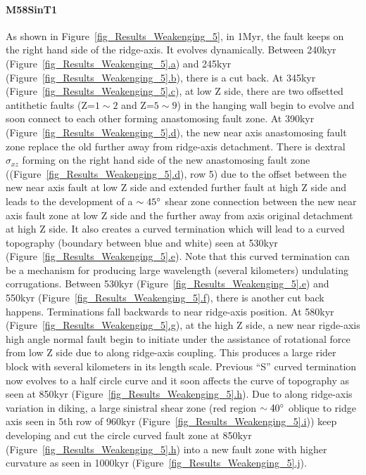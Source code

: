\paragraph{M58SinT1}\label{para_M58SinT1}

As shown in Figure~\hyperref[fig_Results_Weakenging_5]{\ref{fig_Results_Weakenging_5}}, in 1Myr, the fault keeps on the right hand side of the ridge-axis. It evolves dynamically. Between 240kyr (Figure~\hyperref[fig_Results_Weakenging_5]{\ref{fig_Results_Weakenging_5}.a}) and 245kyr (Figure~\hyperref[fig_Results_Weakenging_5]{\ref{fig_Results_Weakenging_5}.b}), there is a cut back. At 345kyr (Figure~\hyperref[fig_Results_Weakenging_5]{\ref{fig_Results_Weakenging_5}.c}), at low Z side, there are two offsetted antithetic faults (Z=$1\sim2$ and Z=$5\sim9$) in the hanging wall begin to evolve and soon connect to each other forming anastomosing fault zone. At 390kyr (Figure~\hyperref[fig_Results_Weakenging_5]{\ref{fig_Results_Weakenging_5}.d}), the new near axis anastomosing fault zone replace the old further away from ridge-axis detachment. There is dextral $\sigma_{xz}$ forming on the right hand side of the new anastomosing fault zone ((Figure~\hyperref[fig_Results_Weakenging_5]{\ref{fig_Results_Weakenging_5}.d}), row 5) due to the offset between the new near axis fault at low Z side and extended further fault at high Z side and leads to the development of a $\sim45\degree$ shear zone connection between the new near axis fault zone at low Z side and the further away from axis original detachment at high Z side. It also creates a curved termination which will lead to a curved topography (boundary between blue and white) seen at 530kyr (Figure~\hyperref[fig_Results_Weakenging_5]{\ref{fig_Results_Weakenging_5}.e}). Note that this curved termination can be a mechanism for producing large wavelength (several kilometers) undulating corrugations. Between 530kyr (Figure~\hyperref[fig_Results_Weakenging_5]{\ref{fig_Results_Weakenging_5}.e}) and 550kyr (Figure~\hyperref[fig_Results_Weakenging_5]{\ref{fig_Results_Weakenging_5}.f}), there is another cut back happens. Terminations fall backwards to near ridge-axis position. At 580kyr (Figure~\hyperref[fig_Results_Weakenging_5]{\ref{fig_Results_Weakenging_5}.g}), at the high Z side, a new near rigde-axis high angle normal fault begin to initiate under the assistance of rotational force from low Z side due to along ridge-axis coupling. This produces a large rider block with several kilometers in its length scale. Previous ``S'' curved termination now evolves to a half circle curve and it soon affects the curve of topography as seen at 850kyr (Figure~\hyperref[fig_Results_Weakenging_5]{\ref{fig_Results_Weakenging_5}.h}). Due to along ridge-axis variation in diking, a large sinistral shear zone (red region $\sim40\degree$ oblique to ridge axis seen in 5th row of 960kyr (Figure~\hyperref[fig_Results_Weakenging_5]{\ref{fig_Results_Weakenging_5}.i})) keep developing and cut the circle curved fault zone at 850kyr (Figure~\hyperref[fig_Results_Weakenging_5]{\ref{fig_Results_Weakenging_5}.h}) into a new fault zone with higher curvature as seen in 1000kyr (Figure~\hyperref[fig_Results_Weakenging_5]{\ref{fig_Results_Weakenging_5}.j}).         

